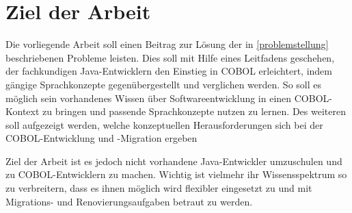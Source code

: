 \section{Ziel der Arbeit}
Die vorliegende Arbeit soll einen Beitrag zur Lösung der in \autoref{problemstellung} beschriebenen Probleme leisten. Dies soll mit Hilfe eines Leitfadens geschehen, der fachkundigen Java-Entwicklern den Einstieg in COBOL erleichtert, indem gängige Sprachkonzepte gegenübergestellt und verglichen werden. 
So soll es möglich sein vorhandenes Wissen über Softwareentwicklung in einen COBOL-Kontext zu bringen und passende Sprachkonzepte nutzen zu lernen. 
Des weiteren soll aufgezeigt werden, welche konzeptuellen Herausforderungen sich bei der COBOL-Entwicklung und -Migration ergeben

Ziel der Arbeit ist es jedoch nicht vorhandene Java-Entwickler umzuschulen und zu COBOL-Entwicklern zu machen. Wichtig ist vielmehr ihr Wissensspektrum so zu verbreitern, dass es ihnen möglich wird flexibler eingesetzt zu und mit Migrations- und Renovierungsaufgaben betraut zu werden.